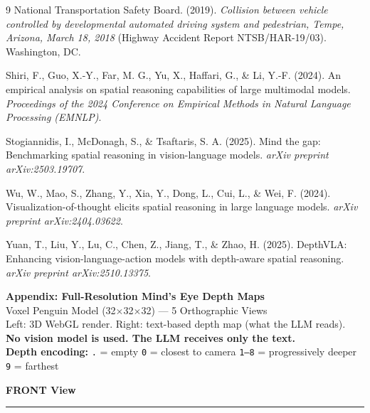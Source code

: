 \documentclass[stu,12pt,a4paper,floatsintext]{apa7}
\begin{document}
\begin{thebibliography}{9}
{National Transportation Safety Board}. (2019). \emph{Collision between vehicle controlled by developmental automated driving system and pedestrian, Tempe, Arizona, March 18, 2018} (Highway Accident Report NTSB/HAR-19/03). Washington, DC.

Shiri, F., Guo, X.-Y., Far, M. G., Yu, X., Haffari, G., \& Li, Y.-F. (2024). An empirical analysis on spatial reasoning capabilities of large multimodal models. \emph{Proceedings of the 2024 Conference on Empirical Methods in Natural Language Processing (EMNLP)}.

Stogiannidis, I., McDonagh, S., \& Tsaftaris, S. A. (2025). Mind the gap: Benchmarking spatial reasoning in vision-language models. \emph{arXiv preprint arXiv:2503.19707}.

Wu, W., Mao, S., Zhang, Y., Xia, Y., Dong, L., Cui, L., \& Wei, F. (2024). Visualization-of-thought elicits spatial reasoning in large language models. \emph{arXiv preprint arXiv:2404.03622}.

Yuan, T., Liu, Y., Lu, C., Chen, Z., Jiang, T., \& Zhao, H. (2025). DepthVLA: Enhancing vision-language-action models with depth-aware spatial reasoning. \emph{arXiv preprint arXiv:2510.13375}.

\end{thebibliography}

\newpage
\begin{center}
{\large\bfseries Appendix: Full-Resolution Mind's Eye Depth Maps}\\[6pt]
\normalsize Voxel Penguin Model (32$\times$32$\times$32) --- 5 Orthographic Views\\
Left: 3D WebGL render. Right: text-based depth map (what the LLM reads).\\
\textbf{No vision model is used. The LLM receives only the text.}\\[6pt]
\small\textbf{Depth encoding:} \texttt{.} = empty \quad \texttt{0} = closest to camera \quad \texttt{1--8} = progressively deeper \quad \texttt{9} = farthest
\end{center}

\vspace{12pt}

\noindent\textbf{FRONT View}\\[-4pt]
\rule{\textwidth}{0.4pt}
\end{document}
